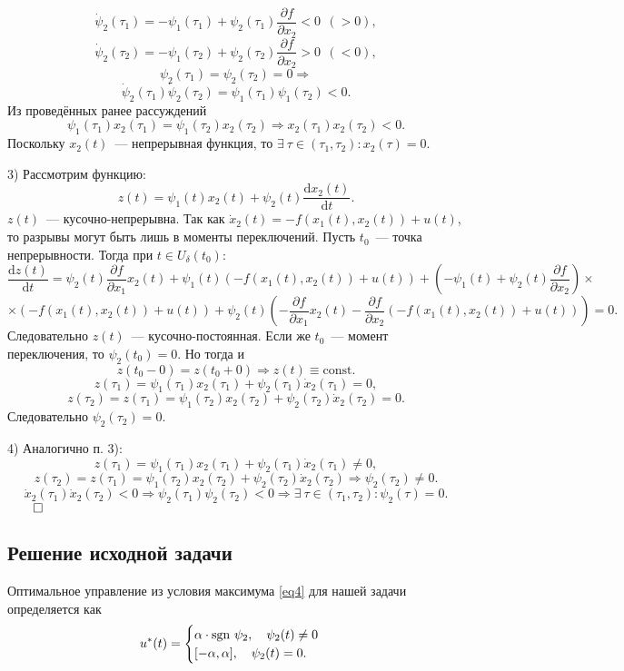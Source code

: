 \documentclass[a4paper,12pt]{article}
\begin{document}
\[ \dot{\psi}_2(\tau_1) = -\psi_1(\tau_1) + \psi_2(\tau_1) \dfrac{\partial f}{\partial x_2} < 0 \ \ (> 0), \]
\[ \dot{\psi}_2(\tau_2) = -\psi_1(\tau_2) + \psi_2(\tau_2) \dfrac{\partial f}{\partial x_2} > 0 \ \ (< 0), \]
\[ \psi_2(\tau_1) = \psi_2(\tau_2) = 0 \Rightarrow \]
\[ \dot{\psi}_2(\tau_1)\dot{\psi}_2(\tau_2) = \psi_1(\tau_1) \psi_1(\tau_2) < 0.\]
Из проведённых ранее рассуждений 
\[ \psi_1(\tau_1)x_2(\tau_1) = \psi_1(\tau_2)x_2(\tau_2) \Rightarrow x_2(\tau_1)x_2(\tau_2) < 0.\]
Поскольку $x_2(t)$~--- непрерывная функция, то $\exists \ \tau \in (\tau_1, \tau_2): x_2(\tau) = 0.$

3)
Рассмотрим функцию:
\[ z(t) = \psi_1(t)x_2(t) + \psi_2(t) \dfrac{\mathrm{d}x_2(t)}{\mathrm{d}t}. \]
$z(t)$~--- кусочно-непрерывна. Так как $\dot{x}_2(t) = -f(x_1(t), x_2(t)) + u(t)$, то разрывы могут быть лишь в моменты переключений. Пусть $t_0$~--- точка непрерывности. Тогда при $t \in U_{\delta}(t_0)$:
\[ \dfrac{\mathrm{d} z(t)}{\mathrm{d} t} = \psi_2(t) \dfrac{\partial f}{\partial x_1}x_2(t) + \psi_1(t) \left(-f(x_1(t), x_2(t)) + u(t) \right) + \left(-\psi_1(t) + \psi_2(t) \dfrac{\partial f}{\partial x_2} \right) \times \]
\[ \times \left(-f(x_1(t), x_2(t)) + u(t)\right) + \psi_2(t) \left( -\dfrac{\partial f}{\partial x_1}x_2(t) - \dfrac{\partial f}{\partial x_2}(-f(x_1(t), x_2(t)) + u(t)) \right) = 0.\]
Следовательно $z(t)$~--- кусочно-постоянная. Если же $t_0$~--- момент переключения, то $\psi_2(t_0) = 0$. Но тогда и
\[ z(t_0 - 0) = z(t_0 + 0) \Rightarrow z(t) \equiv \mathrm{const}. \]
\[ z(\tau_1) = \psi_1(\tau_1)x_2(\tau_1) + \psi_2(\tau_1)\dot{x}_2(\tau_1) = 0, \]
\[ z(\tau_2) = z(\tau_1) = \psi_1(\tau_2)x_2(\tau_2) + \psi_2(\tau_2)\dot{x}_2(\tau_2) = 0. \]
Следовательно $\psi_2(\tau_2) = 0.$  

4) Аналогично п. 3):
\[ z(\tau_1) = \psi_1(\tau_1)x_2(\tau_1) + \psi_2(\tau_1)\dot{x}_2(\tau_1) \neq 0, \]
\[ z(\tau_2) = z(\tau_1) = \psi_1(\tau_2)x_2(\tau_2) + \psi_2(\tau_2)\dot{x}_2(\tau_2) \Rightarrow \psi_2(\tau_2) \neq 0. \]
\[ \dot{x}_2(\tau_1) \dot{x}_2(\tau_2) < 0 \Rightarrow \psi_2(\tau_1)\psi_2(\tau_2) < 0 \Rightarrow \exists \ \tau \in (\tau_1, \tau_2): \psi_2(\tau) = 0.\] 
\hfill
$\qed$

\subsection{Решение исходной задачи}
Оптимальное управление из условия максимума \eqref{eq4} для нашей задачи определяется как 
\begin{equation}\label{eq12}	
	u^*(t) = \begin{cases}
		\alpha \cdot \mathrm{sgn} \ \psi_2, \ \ \ \psi_2(t) \neq 0 \\
		[-\alpha, \alpha], \ \ \ \psi_2(t) = 0.
	\end{cases} 
\end{equation}
\end{document}
